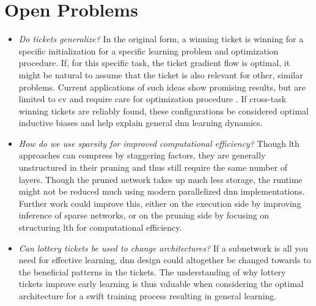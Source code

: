 \documentclass[12pt,fleqn,twocolumn]{article}
\begin{document}
\section*{Open Problems}%
\label{sec:Open Problems}
\begin{itemize}
    \item \emph{Do tickets generalize?}
        In the original form, a winning ticket is winning for a specific initialization for a specific learning problem and optimization procedure.
        If, for this specific task, the ticket gradient flow is optimal, it might be natural to assume that the ticket is also relevant for other, similar problems.
        Current applications of such ideas show promising results, but are limited to \acrshort{cv} and require care for optimization procedure \cite{Morcos2019OneTT}.
        If cross-task winning tickets are reliably found, these configurations be considered optimal inductive biases and help explain general \acrshort{dnn} learning dynamics.
    \item \emph{How do we use sparsity for improved computational efficiency?}
        Though \acrshort{lth} approaches can compress by staggering factors, they are generally unstructured in their pruning and thus still require the same number of layers.
        Though the pruned network takes up much less storage, the runtime might not be reduced much using modern parallelized \acrshort{dnn} implementations.
        Further work could improve this, either on the execution side by improving inference of sparse networks, or on the pruning side by focusing on structuring \acrshort{lth} for computational efficiency.
    \item \emph{Can lottery tickets be used to change architectures?}
        If a subnetwork is all you need for effective learning, \acrshort{dnn} design could altogether be changed towards to the beneficial patterns in the tickets.
        The understanding of why lottery tickets improve early learning is thus valuable when considering the optimal architecture for a swift training process resulting in general learning.
\end{itemize}

\clearpage
\renewcommand*{\bibfont}{\normalfont\footnotesize}
\printbibliography[heading=bibintoc]

\printglossary[type=\acronymtype]
\end{document}
